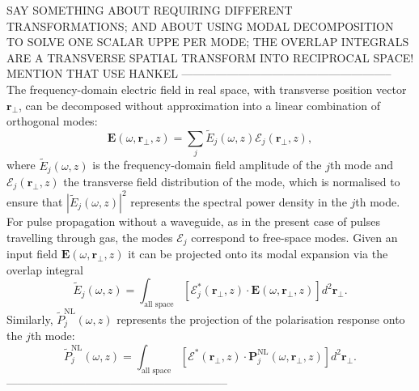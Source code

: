 \documentclass[a4paper]{jpconf}
\begin{document}
SAY SOMETHING ABOUT REQUIRING DIFFERENT TRANSFORMATIONS; AND ABOUT USING MODAL DECOMPOSITION TO SOLVE ONE SCALAR UPPE PER MODE; THE OVERLAP INTEGRALS ARE A TRANSVERSE SPATIAL TRANSFORM INTO RECIPROCAL SPACE! MENTION THAT USE HANKEL
--------------------------------------------------------
The frequency-domain electric field in real space, with transverse position vector $\mathbf{r}_\perp$, can be decomposed without approximation into a linear combination of orthogonal modes:
\begin{equation}\label{eq:modal_decomp}
\mathbf{E}(\omega, \mathbf{r}_\perp, z) = \sum_j \tilde{E}_j(\omega, z) \boldsymbol{\mathcal{E}}_j(\mathbf{r}_\perp, z),
\end{equation}
where $\tilde{E}_j(\omega, z)$ is the frequency-domain field amplitude of the $j$th mode and $\boldsymbol{\mathcal{E}}_j(\mathbf{r}_\perp, z)$ the transverse field distribution of the mode, which is normalised to ensure that $|\tilde{E}_j(\omega,z)|^2$ represents the spectral power density in the $j$th mode. For pulse propagation without a waveguide, as in the present case of pulses travelling through gas, the modes $\boldsymbol{\mathcal{E}}_j$ correspond to free-space modes. Given an input field $\mathbf{E}(\omega, \mathbf{r}_\perp, z)$ it can be projected onto its modal expansion via the overlap integral
\begin{equation}\label{eq:Ej}
\tilde{E}_j(\omega,z) = \int_\text{all space} [ \boldsymbol{\mathcal{E}}^*_j(\mathbf{r}_\perp, z) \cdot \mathbf{E}(\omega, \mathbf{r}_\perp, z)] d^2 \mathbf{r}_\perp.
\end{equation}
Similarly, $\tilde{P}_j^\text{NL}(\omega,z)$ represents the projection of the polarisation response onto the $j$th mode:
\begin{equation}
\tilde{P}_j^\text{NL}(\omega,z) = \int_\text{all space}[ \boldsymbol{\mathcal{E}}^*(\mathbf{r}_\perp,z) \cdot \mathbf{P}_j^\text{NL}(\omega, \mathbf{r}_\perp, z)] d^2 \mathbf{r}_\perp.
\end{equation}
-----------------------------------------------------------
\end{document}

